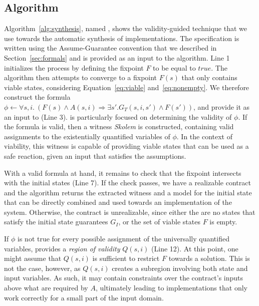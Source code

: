 \subsection{Algorithm}
\label{sec:alg}
Algorithm~\ref{alg:synthesis}, named \jsynvg, shows the validity-guided technique that we use towards the automatic synthesis of implementations. The specification is written using the Assume-Guarantee convention that we described in Section~\ref{sec:formals} and is provided as an input to the algorithm.
Line 1 initializes the process by defining the fixpoint $F$ to be equal to
$true$. The algorithm then attempts to converge to a fixpoint $F(s)$
that only contains viable states, considering Equation~\ref{eq:viable}
and~\ref{eq:nonempty}.
We therefore construct the formula $\phi \gets \forall s,i. \ (F(s) \land A(s,i)
\Rightarrow \exists s'. G_{T}(s,i,s') \land F(s'))$, and provide it as an input to \aeval (Line 3). \aeval is particularly
focused on determining the validity of $\phi$. If the formula is valid, then a witness
\textit{Skolem} is constructed, containing valid assignments to the
existentially quantified variables of $\phi$. In the context of viability, this
witness is capable of providing viable states that can be used as a safe
reaction, given an input that
satisfies the assumptions.

With a valid formula at hand, it remains to check that the fixpoint intersects with the initial states (Line 7).  If the check passes, we have a realizable contract and the algorithm returns the extracted witness and a model for the initial state that can be directly combined and used towards an implementation of the system. Otherwise, the contract is unrealizable, since either the are no states that satisfy the
initial state guarantees $G_I$, or the set of viable states $F$ is empty.


If $\phi$ is not true for every possible assignment of the universally
quantified variables, \aeval provides a \textit{region of validity} $Q(s,i)$
(Line 12).
At this point, one might assume that $Q(s,i)$ is sufficient to restrict $F$ towards a solution. This is not the case, however, as $Q(s,i)$ creates a subregion
involving both state and input variables. As such, it may contain constraints
over the contract's inputs above what are required by $A$, ultimately leading to implementations that only work correctly for a small part of the input domain.

